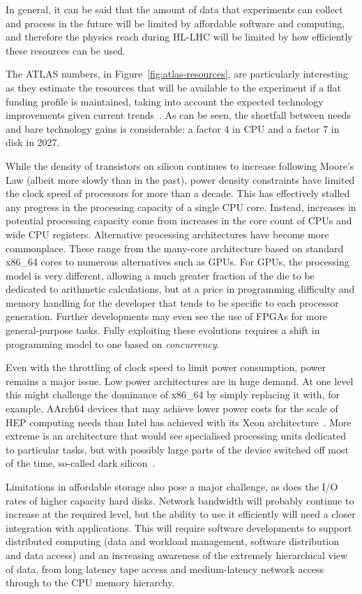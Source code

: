In general, it can be said that the amount of data that experiments can
collect and process in the future will be limited by affordable software
and computing, and therefore the physics reach during HL-LHC will be
limited by how efficiently these resources can be used.

The ATLAS numbers, in Figure~\ref{fig:atlas-resources}, are particularly interesting as they
estimate the resources that will be available to the experiment if a
flat funding profile is maintained, taking into account the expected
technology improvements given current trends~\cite{Panzer2017}. As can be
seen, the shortfall between needs and bare technology gains is
considerable: a factor 4 in CPU and a factor 7 in disk in 2027.

While the density of transistors on silicon continues to increase
following Moore's Law (albeit more slowly than in the past), power
density constraints have limited the clock speed of processors for more
than a decade. This has effectively stalled any progress in the
processing capacity of a single CPU core. Instead, increases in
potential processing capacity come from increases in the core count of
CPUs and wide CPU registers. Alternative processing architectures have
become more commonplace. These range from the many-core architecture
based on standard x86\_64 cores to numerous alternatives such as GPUs.
For GPUs, the processing model is very different, allowing a much
greater fraction of the die to be dedicated to arithmetic calculations,
but at a price in programming difficulty and memory handling for the
developer that tends to be specific to each processor generation.
Further developments may even see the use of FPGAs for more
general-purpose tasks. Fully exploiting these evolutions requires a
shift in programming model to one based on \emph{concurrency}.

Even with the throttling of clock speed to limit power consumption,
power remains a major issue. Low power architectures are in huge demand.
At one level this might challenge the dominance of x86\_64 by simply
replacing it with, for example, AArch64 devices that may achieve lower power
costs for the scale of HEP computing needs than Intel has achieved with its
Xeon architecture~\cite{1742-6596-608-1-012001}. More extreme is an architecture that would see
specialised processing units dedicated to particular tasks, but with
possibly large parts of the device switched off most of the time,
so-called dark silicon~\cite{martin2014,IntelCSA}.

Limitations in affordable storage also pose a major challenge, as does
the I/O rates of higher capacity hard disks. Network
bandwidth will probably continue to increase at the required level, but
the ability to use it efficiently will need a closer integration with
applications. This will require software developments to
support distributed computing (data and workload management, software
distribution and data access) and an increasing awareness of the
extremely hierarchical view of data, from long latency tape access and
medium-latency network access through to the CPU memory hierarchy.

